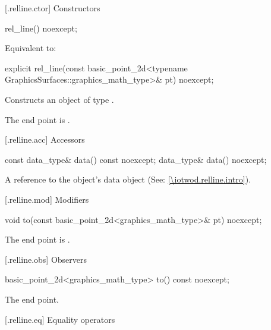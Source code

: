  [\iotwod.relline.ctor] {Constructors}%

%
\begin{itemdecl}
rel_line() noexcept;
\end{itemdecl}
\begin{itemdescr}
\pnum
\effects Equivalent to: 
\end{itemdescr}

%
\begin{itemdecl}
explicit rel_line(const basic_point_2d<typename
  GraphicsSurfaces::graphics_math_type>& pt) noexcept;
\end{itemdecl}
\begin{itemdescr}
\pnum
\effects Constructs an object of type .

\pnum
\remarks The end point is .
\end{itemdescr}

 [\iotwod.relline.acc] {Accessors}%

%
\begin{itemdecl}
const data_type& data() const noexcept;
data_type& data() noexcept;
\end{itemdecl}
\begin{itemdescr}
\pnum
\returns A reference to the  object's data object (See: \ref{\iotwod.relline.intro}).
\end{itemdescr}

 [\iotwod.relline.mod] {Modifiers}%

%
\begin{itemdecl}
void to(const basic_point_2d<graphics_math_type>& pt) noexcept;
\end{itemdecl}
\begin{itemdescr}
\pnum
\effects The end point is .
\end{itemdescr}

 [\iotwod.relline.obs] {Observers} 

%
\begin{itemdecl}
basic_point_2d<graphics_math_type> to() const noexcept;
\end{itemdecl}
\begin{itemdescr}
\pnum
\returns The end point.
\end{itemdescr}

 [\iotwod.relline.eq] {Equality operators}%

